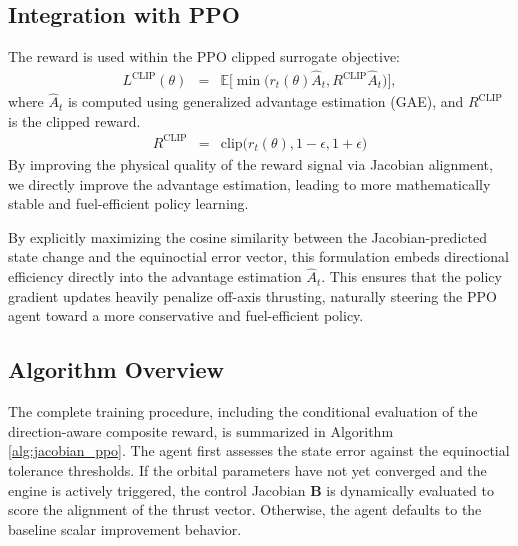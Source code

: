 \documentclass[paper]{ieice}
\begin{document}
\subsection{Integration with PPO}
The reward is used within the PPO clipped surrogate objective:
\begin{eqnarray}
    L^{\mathrm{CLIP}}(\theta)
    & = &
    \mathbb{E} \bigg[ \!\min\! \Big( r_t(\theta)\hat{A}_t, 
R^{\textrm{CLIP}} \hat{A}_t \Big) \!\bigg],
\end{eqnarray}
where $\hat{A}_t$ is computed using generalized advantage estimation (GAE), and $R^{\textrm{CLIP}}$ is the clipped reward.
\begin{eqnarray}
    R^{\textrm{CLIP}}
    & = &
    \mathrm{clip}\big(r_t(\theta), 1 \!- \epsilon, 1 \!+ \epsilon\big)
\end{eqnarray}
By improving the physical quality of the reward signal via Jacobian alignment, we directly improve the advantage estimation, leading to more mathematically stable and fuel-efficient policy learning.

By explicitly maximizing the cosine similarity between the Jacobian-predicted state change and the equinoctial error vector, this formulation embeds directional efficiency directly into the advantage estimation $\hat{A}_t$. This ensures that the policy gradient updates heavily penalize off-axis thrusting, naturally steering the PPO agent toward a more conservative and fuel-efficient policy.

\subsection{Algorithm Overview}
The complete training procedure, including the conditional evaluation of the direction-aware composite reward, is summarized in Algorithm \ref{alg:jacobian_ppo}. The agent first assesses the state error against the equinoctial tolerance thresholds. If the orbital parameters have not yet converged and the engine is actively triggered, the control Jacobian $\mathbf{B}$ is dynamically evaluated to score the alignment of the thrust vector. Otherwise, the agent defaults to the baseline scalar improvement behavior.
\end{document}
